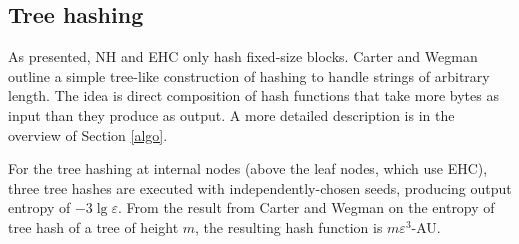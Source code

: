 \documentclass[runningheads]{llncs}
\begin{document}

\subsection{Tree hashing}

As presented, NH and EHC only hash fixed-size blocks.
Carter and Wegman outline a simple tree-like construction of hashing to handle strings of arbitrary length. \cite{badger,carter-wegman-79}
The idea is direct composition of hash functions that take more bytes as input than they produce as output.
A more detailed description is in the overview of Section \ref{algo}.

For the tree hashing at internal nodes (above the leaf nodes, which use EHC), three tree hashes are executed with independently-chosen seeds, producing output entropy of $-3 \lg \varepsilon$.
From the result from Carter and Wegman on the entropy of tree hash of a tree of height $m$, the resulting hash function is $m\varepsilon^3$-AU.







\end{document}
